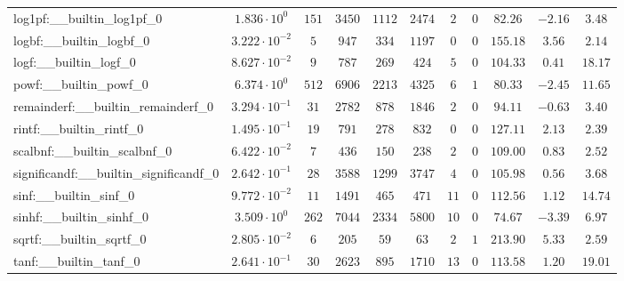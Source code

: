 \begin{tabular}{|l|c|c|c|c|c|c|c|c|c|c|}
log1pf:\_\_builtin\_log1pf\_0             & $ 1.836 \cdot 10^{0}  $ & $ 151    $ & $ 3450   $ & $ 1112  $ & $ 2474  $ & $ 2   $ & $ 0 $ & $ 82.26       $ & $ -2.16   $ & $ 3.48    $ \\
logbf:\_\_builtin\_logbf\_0               & $ 3.222 \cdot 10^{-2} $ & $ 5      $ & $ 947    $ & $ 334   $ & $ 1197  $ & $ 0   $ & $ 0 $ & $ 155.18      $ & $ 3.56    $ & $ 2.14    $ \\
logf:\_\_builtin\_logf\_0                 & $ 8.627 \cdot 10^{-2} $ & $ 9      $ & $ 787    $ & $ 269   $ & $ 424   $ & $ 5   $ & $ 0 $ & $ 104.33      $ & $ 0.41    $ & $ 18.17   $ \\
powf:\_\_builtin\_powf\_0                 & $ 6.374 \cdot 10^{0}  $ & $ 512    $ & $ 6906   $ & $ 2213  $ & $ 4325  $ & $ 6   $ & $ 1 $ & $ 80.33       $ & $ -2.45   $ & $ 11.65   $ \\
remainderf:\_\_builtin\_remainderf\_0     & $ 3.294 \cdot 10^{-1} $ & $ 31     $ & $ 2782   $ & $ 878   $ & $ 1846  $ & $ 2   $ & $ 0 $ & $ 94.11       $ & $ -0.63   $ & $ 3.40    $ \\
rintf:\_\_builtin\_rintf\_0               & $ 1.495 \cdot 10^{-1} $ & $ 19     $ & $ 791    $ & $ 278   $ & $ 832   $ & $ 0   $ & $ 0 $ & $ 127.11      $ & $ 2.13    $ & $ 2.39    $ \\
scalbnf:\_\_builtin\_scalbnf\_0           & $ 6.422 \cdot 10^{-2} $ & $ 7      $ & $ 436    $ & $ 150   $ & $ 238   $ & $ 2   $ & $ 0 $ & $ 109.00      $ & $ 0.83    $ & $ 2.52    $ \\
significandf:\_\_builtin\_significandf\_0 & $ 2.642 \cdot 10^{-1} $ & $ 28     $ & $ 3588   $ & $ 1299  $ & $ 3747  $ & $ 4   $ & $ 0 $ & $ 105.98      $ & $ 0.56    $ & $ 3.68    $ \\
sinf:\_\_builtin\_sinf\_0                 & $ 9.772 \cdot 10^{-2} $ & $ 11     $ & $ 1491   $ & $ 465   $ & $ 471   $ & $ 11  $ & $ 0 $ & $ 112.56      $ & $ 1.12    $ & $ 14.74   $ \\
sinhf:\_\_builtin\_sinhf\_0               & $ 3.509 \cdot 10^{0}  $ & $ 262    $ & $ 7044   $ & $ 2334  $ & $ 5800  $ & $ 10  $ & $ 0 $ & $ 74.67       $ & $ -3.39   $ & $ 6.97    $ \\
sqrtf:\_\_builtin\_sqrtf\_0               & $ 2.805 \cdot 10^{-2} $ & $ 6      $ & $ 205    $ & $ 59    $ & $ 63    $ & $ 2   $ & $ 1 $ & $ 213.90      $ & $ 5.33    $ & $ 2.59    $ \\
tanf:\_\_builtin\_tanf\_0                 & $ 2.641 \cdot 10^{-1} $ & $ 30     $ & $ 2623   $ & $ 895   $ & $ 1710  $ & $ 13  $ & $ 0 $ & $ 113.58      $ & $ 1.20    $ & $ 19.01   $ \\

\end{tabular}
